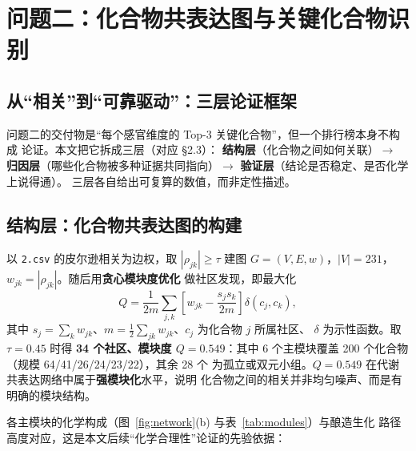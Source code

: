 \section{问题二：化合物共表达图与关键化合物识别}

\subsection{从“相关”到“可靠驱动”：三层论证框架}

问题二的交付物是“每个感官维度的 Top-3 关键化合物”，但一个排行榜本身不构成
论证。本文把它拆成三层（对应 \S2.3）：
\textbf{结构层}（化合物之间如何关联）$\rightarrow$
\textbf{归因层}（哪些化合物被多种证据共同指向）$\rightarrow$
\textbf{验证层}（结论是否稳定、是否化学上说得通）。
三层各自给出可复算的数值，而非定性描述。

\subsection{结构层：化合物共表达图的构建}

以 \texttt{2.csv} 的皮尔逊相关为边权，取 $|\rho_{jk}|\ge\tau$ 建图
$G=(V,E,w)$，$|V|=231$，$w_{jk}=|\rho_{jk}|$。随后用\textbf{贪心模块度优化}
做社区发现\cite{langfelder2008}，即最大化
\begin{equation}
Q=\frac{1}{2m}\sum_{j,k}\left[w_{jk}-\frac{s_js_k}{2m}\right]\delta(c_j,c_k),
\label{eq:modularity}
\end{equation}
其中 $s_j=\sum_k w_{jk}$、$m=\frac12\sum_{jk}w_{jk}$、$c_j$ 为化合物 $j$ 所属社区、
$\delta$ 为示性函数。取 $\tau=0.45$ 时得 \textbf{34 个社区、模块度
$Q=0.549$}：其中 6 个主模块覆盖 200 个化合物（规模 64/41/26/24/23/22），其余 28 个
为孤立或双元小组。$Q=0.549$ 在代谢共表达网络中属于\textbf{强模块化}水平，说明
化合物之间的相关并非均匀噪声、而是有明确的模块结构。

各主模块的化学构成（图~\ref{fig:network}(b) 与表~\ref{tab:modules}）与酿造生化
路径高度对应，这是本文后续“化学合理性”论证的先验依据：

